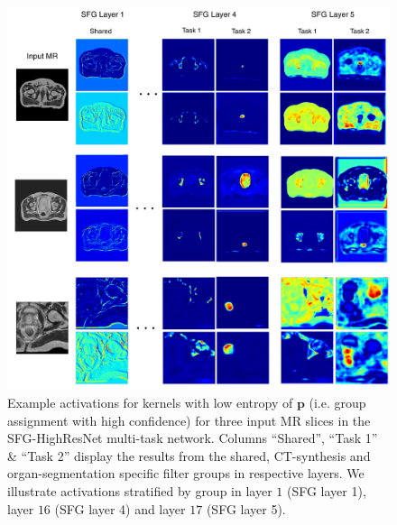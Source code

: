 \begin{figure}[ht]
	\centering
	\vspace{-2mm}
	\includegraphics[width=0.9\linewidth]{chapter_6/figures_supp/figure_1.pdf}
	\vspace{-2mm}
	\caption{\footnotesize Example activations for kernels with low entropy of $\mathbf{p}$ (i.e. group assignment with high confidence) for three input MR slices in the SFG-HighResNet multi-task network. Columns ``Shared'', ``Task 1'' \& ``Task 2'' display the results from the shared, CT-synthesis and organ-segmentation specific filter groups in respective layers. We illustrate activations stratified by group in layer $1$ (SFG layer 1), layer $16$ (SFG layer 4) and layer $17$ (SFG layer 5). }
	\label{fig:act}
\end{figure}

